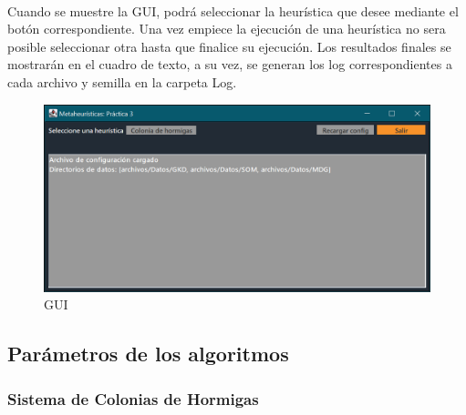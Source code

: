 		\paragraph{}Cuando se muestre la GUI, podrá seleccionar la heurística que desee mediante el botón correspondiente. Una vez empiece la ejecución de una heurística no sera posible seleccionar otra hasta que finalice su ejecución. Los resultados finales se mostrarán en el cuadro de texto, a su vez, se generan los log correspondientes a cada archivo y semilla en la carpeta Log.
	
		\begin{figure}[H]
		
			\centering
			\includegraphics[scale=0.4]{img/GUI}
			\caption{GUI}
		
		\end{figure}
	
	\subsection{Parámetros de los algoritmos}
	
		\subsubsection{Sistema de Colonias de Hormigas}
		
